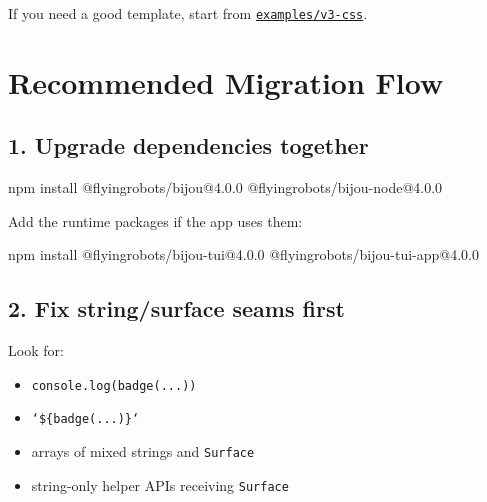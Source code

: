 If you need a good template, start from \href{https://github.com/flyingrobots/bijou/blob/cbd70612140e7a450d764b3c7be1c6af878b99bc/examples/v3-css}{\texttt{e\allowbreak{}x\allowbreak{}a\allowbreak{}m\allowbreak{}p\allowbreak{}l\allowbreak{}e\allowbreak{}s\allowbreak{}/\allowbreak{}v\allowbreak{}3\allowbreak{}-\allowbreak{}c\allowbreak{}s\allowbreak{}s}}.

\section{Recommended Migration Flow}\label{record-010-recommended-migration-flow}

\subsection{1. Upgrade dependencies together}\label{record-010-upgrade-dependencies-together}

\begin{CodeBlock}
npm install @flyingrobots/bijou@4.0.0 @flyingrobots/bijou-node@4.0.0
\end{CodeBlock}

Add the runtime packages if the app uses them:

\begin{CodeBlock}
npm install @flyingrobots/bijou-tui@4.0.0 @flyingrobots/bijou-tui-app@4.0.0
\end{CodeBlock}

\subsection{2. Fix string/surface seams first}\label{record-010-fix-stringsurface-seams-first}

Look for:

\begin{itemize}
\tightlist
\item
  \texttt{c\allowbreak{}o\allowbreak{}n\allowbreak{}s\allowbreak{}o\allowbreak{}l\allowbreak{}e\allowbreak{}.\allowbreak{}l\allowbreak{}o\allowbreak{}g\allowbreak{}(\allowbreak{}b\allowbreak{}a\allowbreak{}d\allowbreak{}g\allowbreak{}e\allowbreak{}(\allowbreak{}.\allowbreak{}.\allowbreak{}.\allowbreak{})\allowbreak{})}
\item
  \texttt{`\allowbreak{}\$\allowbreak{}\{\allowbreak{}b\allowbreak{}a\allowbreak{}d\allowbreak{}g\allowbreak{}e\allowbreak{}(\allowbreak{}.\allowbreak{}.\allowbreak{}.\allowbreak{})\allowbreak{}\}\allowbreak{}`}
\item
  arrays of mixed strings and \texttt{S\allowbreak{}u\allowbreak{}r\allowbreak{}f\allowbreak{}a\allowbreak{}c\allowbreak{}e}
\item
  string-only helper APIs receiving \texttt{S\allowbreak{}u\allowbreak{}r\allowbreak{}f\allowbreak{}a\allowbreak{}c\allowbreak{}e}
\end{itemize}

